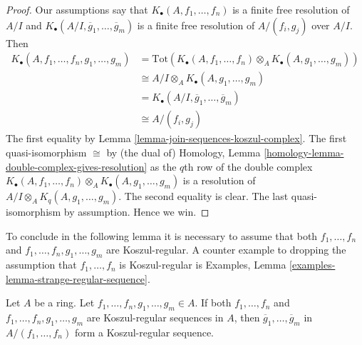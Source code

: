 \begin{proof}
Our assumptions say that $K_\bullet(A, f_1, \ldots, f_n)$ is a finite free
resolution of $A/I$ and
$K_\bullet(A/I, \overline{g}_1, \ldots, \overline{g}_m)$ is a
finite free resolution of $A/(f_i, g_j)$ over $A/I$. Then
\begin{align*}
K_\bullet(A, f_1, \ldots, f_n, g_1, \ldots, g_m)
& = \text{Tot}(K_\bullet(A, f_1, \ldots, f_n) \otimes_A
K_\bullet(A, g_1, \ldots, g_m)) \\
& \cong A/I \otimes_A K_\bullet(A, g_1, \ldots, g_m) \\
& = K_\bullet(A/I, \overline{g}_1, \ldots, \overline{g}_m) \\
& \cong A/(f_i, g_j)
\end{align*}
The first equality by
Lemma \ref{lemma-join-sequences-koszul-complex}.
The first quasi-isomorphism $\cong$ by (the dual of)
Homology, Lemma \ref{homology-lemma-double-complex-gives-resolution}
as the $q$th row of the double complex
$K_\bullet(A, f_1, \ldots, f_n) \otimes_A K_\bullet(A, g_1, \ldots, g_m)$
is a resolution of $A/I \otimes_A K_q(A, g_1, \ldots, g_m)$.
The second equality is clear. The last quasi-isomorphism by assumption.
Hence we win.
\end{proof}

\noindent
To conclude in the following lemma it is necessary to assume that both
$f_1, \ldots, f_n$ and $f_1, \ldots, f_n, g_1, \ldots, g_m$
are Koszul-regular. A counter example to dropping the assumption
that $f_1, \ldots, f_n$ is Koszul-regular is
Examples, Lemma \ref{examples-lemma-strange-regular-sequence}.

\begin{lemma}
\label{lemma-truncate-koszul-regular}
Let $A$ be a ring. Let $f_1, \ldots, f_n, g_1, \ldots, g_m \in A$.
If both $f_1, \ldots, f_n$ and $f_1, \ldots, f_n, g_1, \ldots, g_m$
are Koszul-regular sequences in $A$, then
$\overline{g}_1, \ldots, \overline{g}_m$ in $A/(f_1, \ldots, f_n)$
form a Koszul-regular sequence.
\end{lemma}

